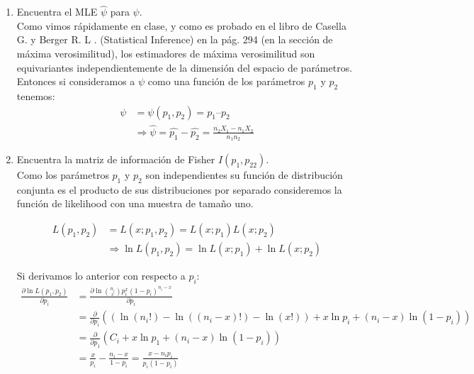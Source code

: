 \documentclass[letter]{memoir} %
\begin{document}
\begin{enumerate}
\begin{enumerate}
\item Encuentra el MLE $\hat{\psi}$   para $\psi$.\\
Como vimos rápidamente en clase, y como es probado en el libro de Casella G. y Berger R. L . (Statistical Inference) en la pág. 294 (en la sección de máxima verosimilitud), los estimadores de máxima verosimilitud son equivariantes independientemente de la dimensión del espacio de parámetros. \\
Entonces si consideramos a $\psi$ como una función de los parámetros $p_1$ y $p_2$ tenemos:\\
\begin{equation*}
\begin{split}
{\psi} &= \psi(p_1, p_2) = p_1 – p_2 \\
		& \Rightarrow \hat{\psi} = \hat{p_1} - \hat{p_2} = \frac{n_2X_1-n_1X_2}{n_1n_2}
\end{split}
\end{equation*}

\item
Encuentra la matriz de información de Fisher $I(p_1, p_22)$.\\
Como los parámetros $p_1$ y $p_2$ son independientes su función de distribución conjunta es el producto de sus distribuciones por separado consideremos la función de likelihood con una muestra de tamaño uno.

\begin{equation}
\begin{split}
L(p_1, p_2 ) & = L(x;p_1, p_2 )  = L(x; p_1)L(x;p_2) \\
& \Rightarrow \ln L(p_1,p_2) = \ln L(x;p_1) + \ln  L(x;p_2)
\end{split}
\end{equation}

Si derivamos lo anterior con respecto a $p_i$:\\
\begin{equation}
\begin{split}
\frac{\partial\ln L(p_1,p_2)}{\partial p_i} & =
\frac{\partial\ln {{n_i}\choose{x}} p_i^x(1-p_i)^{n_i-x} } {\partial p_i} \\
&= \frac{\partial}{\partial p_i} ( (\ln (n_i! ) - \ln((n_i-x)! ) - \ln(x!) ) +x\ln p_i + (n_i - x)\ln (1-p_i) )  \\
& = \frac{\partial}{\partial p_1} ( C_i + x\ln p_1 + (n_i - x)\ln (1-p_i) ) \\
& = \frac{x}{p_i} - \frac{n_i-x}{1-p_i} = \frac{x-n_ip_i}{p_i(1-p_i)}
\end{split}
\end{equation}



\end{enumerate}
\end{enumerate}
\end{document}
